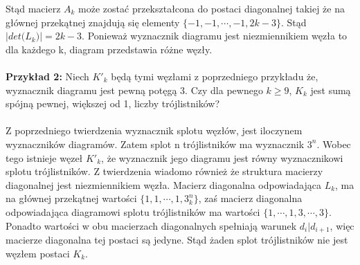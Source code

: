 Stąd macierz $A_{k} $ może zostać przekształcona do postaci diagonalnej takiej że na głównej przekątnej znajdują się elementy $\lbrace -1, -1, \cdots, -1, 2k-3 \rbrace$. Stąd $\vert det \big( L_{k} \big) \vert = 2k - 3$. Ponieważ wyznacznik diagramu jest niezmiennikiem węzła to dla każdego k, diagram przedstawia różne węzły. \\ \\

 \textbf{Przykład 2:}
 Niech $K'_{k}$ będą tymi węzłami z poprzedniego przykładu że, wyznacznik diagramu jest pewną potęgą 3. Czy dla pewnego $k\geq9$, $K_{k}$  jest sumą spójną pewnej, większej od 1, liczby trójlistników? \\ \\
 Z poprzedniego twierdzenia wyznacznik splotu węzłów, jest iloczynem wyznaczników diagramów. Zatem splot n trójlistników ma wyznacznik $3^n$. Wobec tego istnieje węzeł $K'_{k}$, że wyznacznik jego diagramu jest równy wyznacznikowi splotu trójlistników. Z twierdzenia wiadomo również że struktura macierzy diagonalnej jest niezmiennikiem węzła. Macierz diagonalna odpowiadająca $L_{k}$, ma na głównej przekątnej wartości $\lbrace 1, 1, \cdots, 1, 3^n_{k} \rbrace$, zaś macierz diagonalna odpowiadająca diagramowi splotu trójlistników ma wartości $\lbrace 1, \cdots, 1, 3, \cdots, 3 \rbrace$. Ponadto wartości w obu macierzach diagonalnych spełniają warunek $d_{i} \vert d_{i+1}$, więc macierze diagonalna tej postaci są jedyne. Stąd żaden splot trójlistników nie jest węzłem postaci $K_{k}$.
 

 